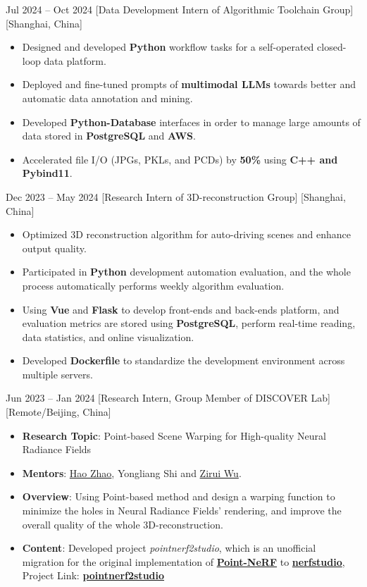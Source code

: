 \documentclass{chicv}
\begin{document}
{Jul 2024 -- Oct 2024}
  [Data Development Intern of Algorithmic Toolchain Group]
  [Shanghai, China]
  \begin{itemize}
    \item Designed and developed \textbf{Python} workflow tasks for a self-operated closed-loop data platform.
    \item Deployed and fine-tuned prompts of \textbf{multimodal LLMs} towards better and automatic data annotation and mining.
    \item Developed \textbf{Python-Database} interfaces in order to manage large amounts of data stored in \textbf{PostgreSQL} and \textbf{AWS}.
    \item Accelerated file I/O (JPGs, PKLs, and PCDs) by \textbf{50\%} using \textbf{C++ and Pybind11}.
  \end{itemize}

{Dec 2023 -- May 2024}
  [Research Intern of 3D-reconstruction Group]
  [Shanghai, China]
  \begin{itemize}
    \item Optimized 3D reconstruction algorithm for auto-driving scenes and enhance output quality.
    \item Participated in \textbf{Python} development automation evaluation, and the whole process automatically performs weekly algorithm evaluation.
    \item Using \textbf{Vue} and \textbf{Flask} to develop front-ends and back-ends platform, and evaluation metrics are stored using \textbf{PostgreSQL}, perform real-time reading, data statistics, and online visualization.
    \item Developed \textbf{Dockerfile} to standardize the development environment across multiple servers.
  \end{itemize}

  {Jun 2023 -- Jan 2024}
  [Research Intern, Group Member of DISCOVER Lab]
  [Remote/Beijing, China]
  \begin{itemize}
    \item \textbf{Research Topic}: Point-based Scene Warping for High-quality Neural Radiance Fields
    \item \textbf{Mentors}: \href{https://sites.google.com/view/fromandto}{Hao Zhao}, Yongliang Shi and \href{https://wuzirui.github.io/}{Zirui Wu}.
    \item \textbf{Overview}: Using Point-based method and design a warping function to minimize the holes in Neural Radiance Fields' rendering, and improve the overall quality of the whole 3D-reconstruction.
    \item \textbf{Content}: Developed project \textit{pointnerf2studio}, which is an unofficial migration for the original implementation of \href{https://github.com/Xharlie/pointnerf/}{\textbf{Point-NeRF}} to \href{https://github.com/nerfstudio-project/nerfstudio/}{\textbf{nerfstudio}}, Project Link: \href{https://github.com/SHUzhekiNg/pointnerf2studio}{\textbf{pointnerf2studio}}
  \end{itemize}
\end{document}
